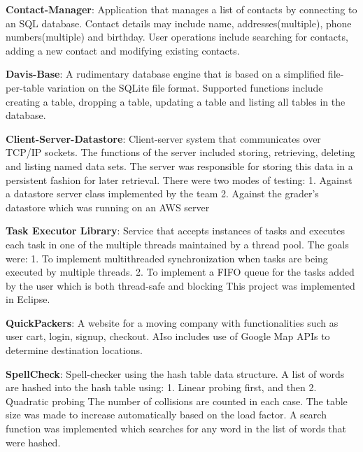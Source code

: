 \documentclass[letterpaper,11pt]{article}
\newcommand{\resumeItem}[2]{
  \item\small{
    \textbf{#1}{: #2 \vspace{-2pt}}
  }
}
\newcommand{\resumeSubItem}[2]{\resumeItem{#1}{#2}\vspace{-4pt}}
\begin{document}
\resumeSubItem{Contact-Manager}
      {Application that manages a list of contacts by connecting to  an SQL database. Contact details may include name, addresses(multiple), phone numbers(multiple) and birthday. User operations include searching for contacts, adding a new contact and modifying existing contacts.}
      
\resumeSubItem{Davis-Base}
      {A rudimentary database engine that is based on a simplified file-per-table variation on the SQLite file format. Supported functions include creating a table, dropping a table, updating a table and listing all tables in the database.}
      
      
    \resumeSubItem{Client-Server-Datastore}
      {Client-server system that communicates over TCP/IP sockets. The functions of the server included storing, retrieving, deleting and listing named data sets. The server was responsible for storing this data in a persistent fashion for later retrieval. 
There were two modes of testing:
1. Against a datastore server class implemented by the team
2. Against the grader's datastore which was running on an AWS server}
 
 
  \resumeSubItem{Task Executor Library}
      {Service that accepts instances of tasks and executes each task in one of the multiple threads maintained by a thread pool. The goals were:
1. To implement multithreaded synchronization when tasks are being executed by multiple threads.
2. To implement a FIFO queue for the tasks added by the user which is both thread-safe and blocking
This project was implemented in Eclipse.}
      
      
      
    


 \resumeSubItem{QuickPackers}
      {A website for a moving company with functionalities such as user cart, login,  signup, checkout. AIso includes use of Google Map APIs to determine destination locations.
      }
      
      
      
      \resumeSubItem{SpellCheck}
      {Spell-checker using the hash table data structure. A list of words are hashed into the hash table using:
1. Linear probing first, and then
2. Quadratic probing 
The number of collisions are counted in each case. The table size was made to increase automatically based on the load factor.
A search function was implemented which searches for any word in the list of words that were hashed.}
      
      
      
\end{document}
